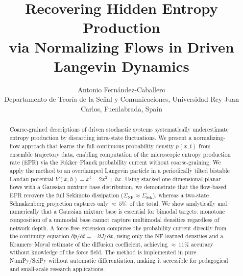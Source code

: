 \documentclass[11pt]{article}
\title{Recovering Hidden Entropy Production\\via Normalizing Flows in Driven Langevin Dynamics}
\author{Antonio Fern\'andez-Caballero\\
\small Departamento de Teor\'ia de la Se\~nal y Comunicaciones,
Universidad Rey Juan Carlos, Fuenlabrada, Spain}
\date{}
\begin{document}
\maketitle

\begin{abstract}
Coarse-grained descriptions of driven stochastic systems systematically underestimate entropy production by discarding intra-state fluctuations.
We present a normalizing-flow approach that learns the full continuous probability density $p(x,t)$ from ensemble trajectory data, enabling computation of the microscopic entropy production rate (EPR) via the Fokker--Planck probability current without coarse-graining.
We apply the method to an overdamped Langevin particle in a periodically tilted bistable Landau potential $V(x,h) = x^4 - 2x^2 + hx$.
Using stacked one-dimensional planar flows with a Gaussian mixture base distribution, we demonstrate that the flow-based EPR recovers the full Sekimoto dissipation ($\Sigma_{\mathrm{NF}} \approx \Sigma_{\mathrm{Sek}}$), whereas a two-state Schnakenberg projection captures only ${\approx}\,5\%$~of the total.
We show analytically and numerically that a Gaussian mixture base is essential for bimodal targets: monotone composition of a unimodal base cannot capture multimodal densities regardless of network depth.
A force-free extension computes the probability current directly from the continuity equation $\partial p/\partial t = -\partial J/\partial x$, using only the NF-learned densities and a Kramers--Moyal estimate of the diffusion coefficient, achieving ${\approx}\,11\%$ accuracy without knowledge of the force field.
The method is implemented in pure NumPy/SciPy without automatic differentiation, making it accessible for pedagogical and small-scale research applications.
\end{abstract}







\end{document}
